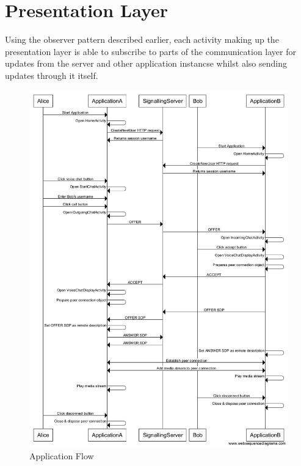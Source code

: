 \documentclass[]{report}
\begin{document}
		\section{Presentation Layer}
		Using the observer pattern described earlier, each activity making up the presentation layer is able to subscribe to parts of the communication layer for updates from the server and other application instancse whilst also sending updates through it itself. 
		
		\begin{figure}[H]
			\caption{Application Flow}
			\includegraphics[scale=0.3]{ApplicationFlow.png}
		\end{figure}	
					
\end{document}

